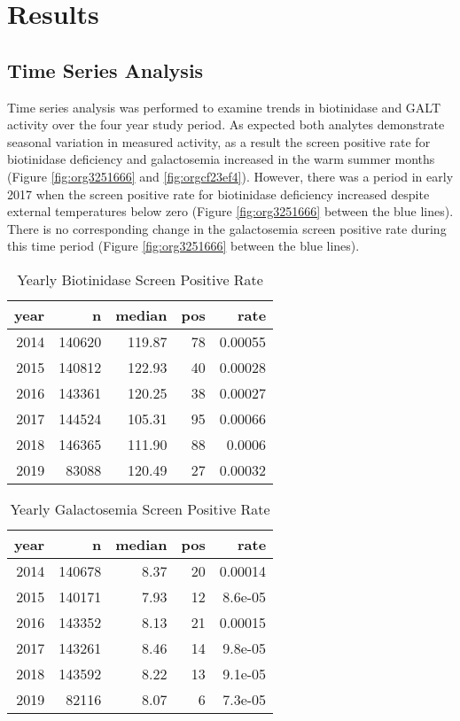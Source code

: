 \documentclass[review]{elsarticle}
\begin{document}
\section*{Results}
\label{sec:org3c7c2c2}
\subsection*{Time Series Analysis}
\label{sec:org51edebe}
Time series analysis was performed to examine trends in biotinidase
and GALT activity over the four year study period. As expected both
analytes demonstrate seasonal variation in measured activity, as a
result the screen positive rate for biotinidase deficiency and
galactosemia increased in the warm summer months (Figure \ref{fig:org3251666}
and \ref{fig:orgcf23ef4}). However, there was a period in early 2017 when the
screen positive rate for biotinidase deficiency increased despite
external temperatures below zero (Figure \ref{fig:org3251666} between the blue
lines). There is no corresponding change in the galactosemia screen
positive rate during this time period (Figure \ref{fig:org3251666} between the
blue lines).

\begin{table}[ht]
\centering
\begin{tabular}{rrrrr}
  \hline
year & n & median & pos & rate \\ 
  \hline
2014 & 140620 & 119.87 &  78 & 0.00055 \\ 
  2015 & 140812 & 122.93 &  40 & 0.00028 \\ 
  2016 & 143361 & 120.25 &  38 & 0.00027 \\ 
  2017 & 144524 & 105.31 &  95 & 0.00066 \\ 
  2018 & 146365 & 111.90 &  88 & 0.0006 \\ 
  2019 & 83088 & 120.49 &  27 & 0.00032 \\ 
   \hline
\end{tabular}
\caption{Yearly Biotinidase Screen Positive Rate} 
\label{tab:biot_year}
\end{table}

\begin{table}[ht]
\centering
\begin{tabular}{rrrrr}
  \hline
year & n & median & pos & rate \\ 
  \hline
2014 & 140678 & 8.37 &  20 & 0.00014 \\ 
  2015 & 140171 & 7.93 &  12 & 8.6e-05 \\ 
  2016 & 143352 & 8.13 &  21 & 0.00015 \\ 
  2017 & 143261 & 8.46 &  14 & 9.8e-05 \\ 
  2018 & 143592 & 8.22 &  13 & 9.1e-05 \\ 
  2019 & 82116 & 8.07 &   6 & 7.3e-05 \\ 
   \hline
\end{tabular}
\caption{Yearly Galactosemia Screen Positive Rate} 
\label{tab:galt_year}
\end{table}
\end{document}
